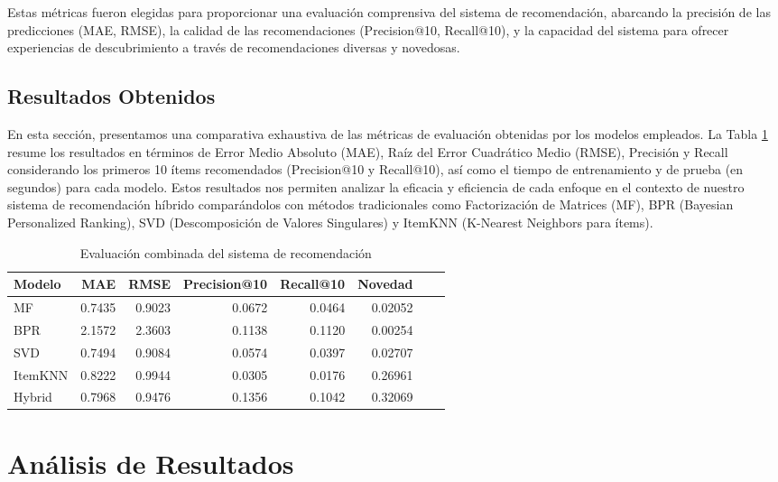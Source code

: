 \documentclass[a4paper,12pt]{report}
\begin{document}
Estas métricas fueron elegidas para proporcionar una evaluación comprensiva del sistema de recomendación, abarcando la precisión de las predicciones (MAE, RMSE), la calidad de las recomendaciones (Precision@10, Recall@10), y la capacidad del sistema para ofrecer experiencias de descubrimiento a través de recomendaciones diversas y novedosas.




        \subsection{Resultados Obtenidos}

        En esta sección, presentamos una comparativa exhaustiva de las métricas de evaluación obtenidas por los modelos empleados. La Tabla \ref{tab:metrics} resume los resultados en términos de Error Medio Absoluto (MAE), Raíz del Error Cuadrático Medio (RMSE), Precisión y Recall considerando los primeros 10 ítems recomendados (Precision@10 y Recall@10), así como el tiempo de entrenamiento y de prueba (en segundos) para cada modelo. Estos resultados nos permiten analizar la eficacia y eficiencia de cada enfoque en el contexto de nuestro sistema de recomendación híbrido comparándolos con métodos tradicionales como Factorización de Matrices (MF), BPR (Bayesian Personalized Ranking), SVD (Descomposición de Valores Singulares) y ItemKNN (K-Nearest Neighbors para ítems).
    \begin{table}[h]
        \centering
        \caption{Evaluación combinada del sistema de recomendación}
        \label{tab:metrics}
        \begin{tabular}{lrrrrrrr}
        \hline
        \textbf{Modelo} & \textbf{MAE} & \textbf{RMSE} & \textbf{Precision@10} & \textbf{Recall@10} & \textbf{Novedad} \\ \hline
        MF      & 0.7435 & 0.9023 & 0.0672 & 0.0464  & 0.02052 \\
        BPR     & 2.1572 & 2.3603 & 0.1138 & 0.1120 & 0.00254 \\
        SVD     & 0.7494 & 0.9084 & 0.0574 & 0.0397 & 0.02707 \\
        ItemKNN & 0.8222 & 0.9944 & 0.0305 & 0.0176 & 0.26961 \\
        Hybrid  & 0.7968 & 0.9476 & 0.1356 & 0.1042 & 0.32069 \\ \hline
        \end{tabular}
    \end{table}
    \section{Análisis de Resultados}
\end{document}
